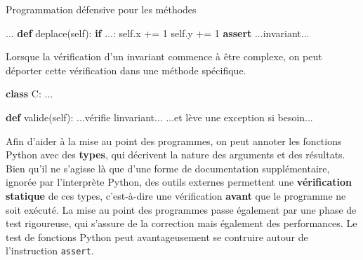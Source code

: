 \documentclass[a4paper,17pt]{extarticle}
\newenvironment{Shaded}{}{}
\newcommand{\KeywordTok}[1]{\textcolor[rgb]{0.00,0.44,0.13}{\textbf{{#1}}}}
\newcommand{\DecValTok}[1]{\textcolor[rgb]{0.25,0.63,0.44}{{#1}}}
\newcommand{\StringTok}[1]{\textcolor[rgb]{0.25,0.44,0.63}{{#1}}}
\newcommand{\NormalTok}[1]{{#1}}
\newcommand{\VariableTok}[1]{\textcolor[rgb]{0.10,0.09,0.49}{{#1}}}
\newcommand{\ControlFlowTok}[1]{\textcolor[rgb]{0.00,0.44,0.13}{\textbf{{#1}}}}
\newcommand{\OperatorTok}[1]{\textcolor[rgb]{0.40,0.40,0.40}{{#1}}}
\begin{document}
\begin{exemple}
Programmation défensive pour les méthodes

\begin{Shaded}
\begin{Highlighting}[]
\NormalTok{    ...}
    \KeywordTok{def}\NormalTok{ deplace(}\VariableTok{self}\NormalTok{):}
        \ControlFlowTok{if}\NormalTok{ ...:}
            \VariableTok{self}\NormalTok{.x }\OperatorTok{+=} \DecValTok{1}
            \VariableTok{self}\NormalTok{.y }\OperatorTok{+=} \DecValTok{1}
        \ControlFlowTok{assert}\NormalTok{ ...invariant...}
\end{Highlighting}
\end{Shaded}

        \end{exemple}\begin{exemple}
    Lorsque la vérification d'un invariant commence à être complexe, on peut
déporter cette vérification dans une méthode spécifique.

\begin{Shaded}
\begin{Highlighting}[]
\KeywordTok{class}\NormalTok{ C:}
\NormalTok{    ...}

    \KeywordTok{def}\NormalTok{ valide(}\VariableTok{self}\NormalTok{):}
\NormalTok{        ...vérifie l}\StringTok{\textquotesingle{}invariant...}
\StringTok{        ...et lève une exception si besoin...}
\end{Highlighting}
\end{Shaded}

        \end{exemple}\begin{retenir}
    Afin d'aider à la mise au point des programmes, on peut annoter les
fonctions Python avec des \textbf{types}, qui décrivent la nature des
arguments et des résultats. Bien qu'il ne s'agisse là que d'une forme de
documentation supplémentaire, ignorée par l'interprète Python, des
outils externes permettent une \textbf{vérification statique} de ces
types, c'est-à-dire une vérification \textbf{avant} que le programme ne
soit exécuté. La mise au point des programmes passe également par une
phase de test rigoureuse, qui s'assure de la correction mais également
des performances. Le test de fonctions Python peut avantageusement se
contruire autour de l'instruction \texttt{assert}.

        \end{retenir}

    
    
    
\end{document}
